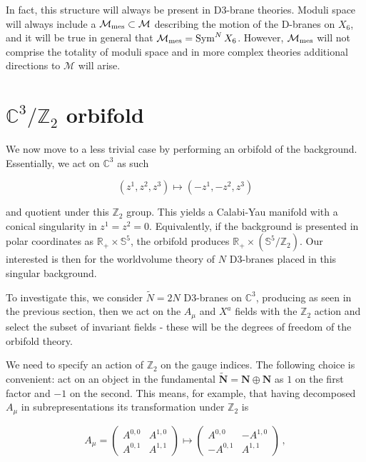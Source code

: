 In fact, this structure will always be present in D3-brane theories. Moduli space will always include a $\mathcal{M}_\mathrm{mes} \subset \mathcal{M}$ describing the motion of the D-branes on $X_6$, and it will be true in general that $\mathcal{M}_\mathrm{mes} = \operatorname{Sym}^N X_6$. However, $\mathcal{M}_\mathrm{mes}$ will not comprise the totality of moduli space and in more complex theories additional directions to $\mathcal{M}$ will arise.

\section{$\mathbb{C}^3/\mathbb{Z}_2$ orbifold}

We now move to a less trivial case by performing an orbifold of the background. Essentially, we act on $\mathbb{C}^3$ as such

\begin{equation}
	(z^1, z^2, z^3) \mapsto (-z^1, -z^2, z^3)
	\label{}
\end{equation}

and quotient under this $\mathbb{Z}_2$ group. This yields a Calabi-Yau manifold with a conical singularity in $z^1 = z^2 =0$. Equivalently, if the background is presented in polar coordinates as $\mathbb{R}_+ \times \mathbb{S}^5$, the orbifold produces $\mathbb{R}_+ \times (\mathbb{S}^5 / \mathbb{Z}_2)$. Our interested is then for the worldvolume theory of $N$ D3-branes placed in this singular background.

To investigate this, we consider $\tilde N = 2N$ D3-branes on $\mathbb{C}^3$, producing \SYM as seen in the previous section, then we act on the $A_\mu$ and $X^a$ fields with the $\mathbb{Z}_2$ action and select the subset of invariant fields - these will be the degrees of freedom of the orbifold theory.

We need to specify an action of $\mathbb{Z}_2$ on the gauge indices. The following choice is convenient: act on an object in the fundamental $\mathbf{\tilde N} = \mathbf{N} \oplus \mathbf{N}$ as $1$ on the first factor and $-1$ on the second. This means, for example, that having decomposed $A_\mu$ in subrepresentations its transformation under $\mathbb{Z}_2$ is

\begin{equation}
	A_\mu = \begin{pmatrix}
		A^{0,0} & A^{1,0} \\
		A^{0,1} & A^{1,1}
	\end{pmatrix} \mapsto \begin{pmatrix}
		A^{0,0} & -A^{1,0} \\
		-A^{0,1} & A^{1,1}
	\end{pmatrix}\,,
\end{equation}

